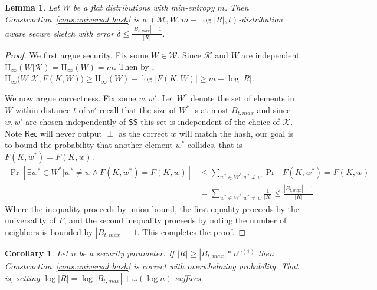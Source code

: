 \documentclass[11pt]{article}
\newcommand{\consref}[1]{\mbox{Construction~\ref{#1}}}
\newcommand{\class}[1]{{\ensuremath{\mathsf{#1}}}}
\newcommand{\sketch}{\ensuremath{\class{SS}}\xspace}
\newcommand{\rec}{\ensuremath{\class{Rec}}\xspace}
\newcommand{\Hoo}{\mathrm{H}_\infty}
\newcommand{\Hav}{\tilde{\mathrm{H}}_\infty}
\newtheorem{lemma}[theorem]{Lemma}
\newtheorem{corollary}[theorem]{Corollary}
\begin{document}
\begin{lemma}
\label{lem:flat hashing}
Let $W$ be a flat distributions with min-entropy $m$.  Then
\consref{cons:universal hash} is a $(\mathcal{M}, W, m - \log |R|, t)$-distribution aware secure sketch with error $\delta \le \frac{|B_{t, max}|-1}{|R|}$. 
\end{lemma}
\begin{proof}
We first argue security.  Fix some $W\in\mathcal{W}$. Since $\mathcal{K}$ and $W$ are independent $\Hav(W | \mathcal{K}) = \Hoo(W) = m$.  Then by \cite[Lemma 2.2b]{DBLP:journals/siamcomp/DodisORS08}, $\Hav(W | \mathcal{K}, F(K, W)) \ge \Hoo(W) - \log |F(K, W)| \ge m - \log |R|$.

We now argue correctness.  Fix some $w, w'$.  Let $W^*$ denote the set of elements in $W$ within distance $t$ of $w'$ recall that the size of $W^*$ is at most $B_{t, max}$ and since $w, w'$ are chosen independently of $\sketch$ this set is independent of the choice of $\mathcal{K}$.  Note $\rec$ will never output $\perp$ as the correct $w$ will match the hash, our goal is to bound the probability that another element $w^*$ collides, that is $F(K, w^*) = F(K, w)$.
\begin{align*}
\Pr[\exists w^* \in W^* |w^* \neq w \wedge F(K, w^*) = F(K, w)] &\le \sum_{w^*\in W^* | w^*\neq w} \Pr[F(K, w^*) = F(K, w)] \\
 &= \sum_{w^*\in W^* | w^*\neq w} \frac{1}{|R|} \le \frac{|B_{t, max}|-1}{|R|}
\end{align*}
Where the inequality proceeds by union bound, the first equality proceeds by the universality of $F$, and the second inequality proceeds by noting the number of neighbors is bounded by $|B_{t, max}|-1$.  This completes the proof.
\end{proof}
\begin{corollary}
Let $n$ be a security parameter.  
If $|R| \ge |B_{t, max}|* n^{\omega(1)}$ then \consref{cons:universal hash} is correct with overwhelming probability.  That is, setting $\log |R| = \log |B_{t, max}| + \omega(\log n)$ suffices.
\end{corollary}
\end{document}
